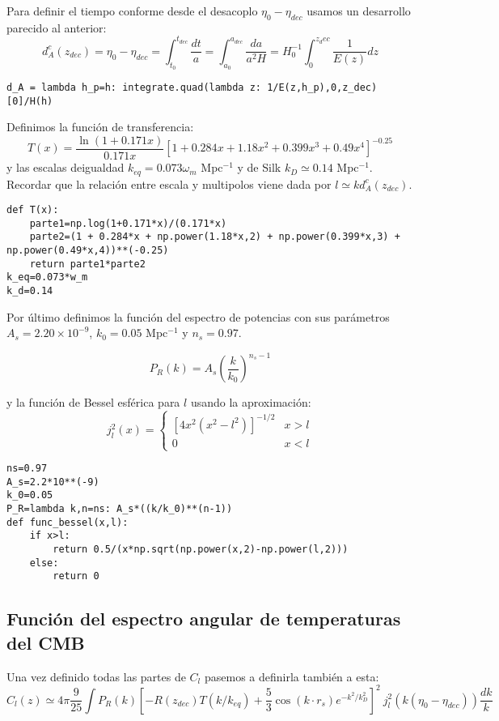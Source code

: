 \documentclass{article}
\begin{document}
Para definir el tiempo conforme desde el desacoplo $\eta_0-\eta_{dec}$ usamos un desarrollo parecido al anterior:
$$
d_A^c(z_{dec})=\eta_0-\eta_{dec}=\int_{t_0}^{t_{dec}} \frac{dt}{a}=\int_{a_0}^{a_{dec}} \frac{da}{a^2H}=H_0^{-1}\int_0^{z_dec} \frac{1}{E(z)}dz
$$

\begin{lstlisting}[style=Python]
d_A = lambda h_p=h: integrate.quad(lambda z: 1/E(z,h_p),0,z_dec)[0]/H(h)
\end{lstlisting}

Definimos la función de transferencia:
$$T(x)=\frac{\ln(1+0.171x)}{0.171x}\left[1 + 0.284x + 1.18x^2 + 0.399x^3 + 0.49x^4\right]^{-0.25}$$
y las escalas deigualdad $k_{eq}=0.073\omega_m$ Mpc$^{-1}$ y de Silk $k_D\simeq 0.14$ Mpc$^{-1}$. Recordar que la relación entre escala y multipolos viene dada por $l\simeq k d_A^c(z_{dec})$.
\begin{lstlisting}[style=Python]
def T(x):
    parte1=np.log(1+0.171*x)/(0.171*x)
    parte2=(1 + 0.284*x + np.power(1.18*x,2) + np.power(0.399*x,3) + np.power(0.49*x,4))**(-0.25)
    return parte1*parte2
k_eq=0.073*w_m
k_d=0.14
\end{lstlisting}

Por último definimos la función del espectro de potencias con sus parámetros $A_s=2.20\times 10^{-9}$, $k_0=0.05$ Mpc$^{-1}$ y $n_s=0.97$.

$$P_R(k)=A_s\left(\frac{k}{k_0}\right)^{n_s-1}$$

y la función de Bessel esférica para $l$ usando la aproximación:
$$
j_l^2(x)=\begin{cases}
\left[4x^2(x^2-l^2)\right]^{-1/2} & x>l\\
0 & x<l
\end{cases}
$$

\begin{lstlisting}[style=Python]
ns=0.97
A_s=2.2*10**(-9)
k_0=0.05
P_R=lambda k,n=ns: A_s*((k/k_0)**(n-1))
def func_bessel(x,l):
    if x>l:
        return 0.5/(x*np.sqrt(np.power(x,2)-np.power(l,2)))
    else:
        return 0
\end{lstlisting}

\subsection*{Función del espectro angular de temperaturas del CMB}
Una vez definido todas las partes de $C_l$ pasemos a definirla también a esta:
$$C_l(z)\simeq 4\pi\frac{9}{25}\int P_R(k)\left[-R(z_{dec})T(k/k_{eq})+\frac{5}{3}\cos(k\cdot r_s)e^{-k^2/k_D^2}\right]^2\ j_l^2(k(\eta_0-\eta_{dec}))\frac{dk}{k}$$
\end{document}
